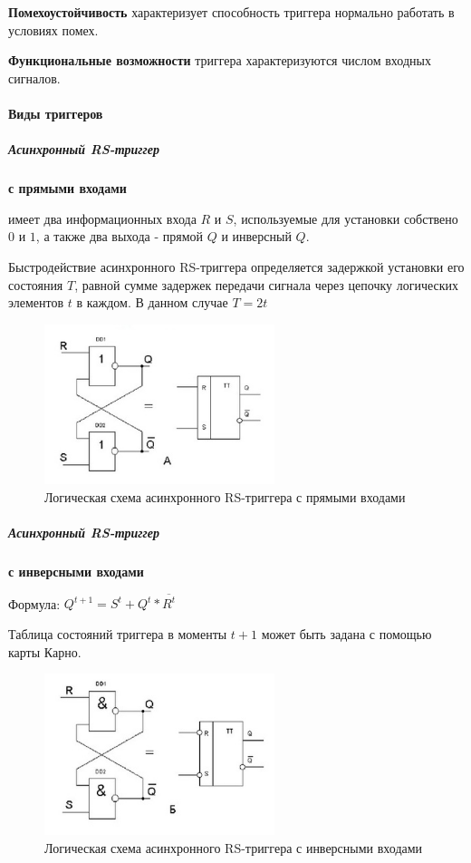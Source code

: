 \documentclass{article}
\begin{document}
\begin{flushleft}
\textbf{Помехоустойчивость} характеризует способность триггера нормально работать в условиях помех.

\textbf{Функциональные возможности} триггера характеризуются числом входных сигналов.

\paragraph{Виды триггеров}

\subparagraph{Асинхронный RS-триггер} \textbf{с прямыми входами}

имеет два информационных входа $R$ и $S$, используемые для установки собствено $0$ и $1$, а также два выхода - прямой $Q$ и инверсный $Q$.

Быстродействие асинхронного RS-триггера определяется задержкой установки его состояния $T$, равной сумме задержек передачи сигнала через цепочку логических элементов $t$ в каждом. В данном случае $T = 2t$

\begin{figure}
\caption{Логическая схема асинхронного RS-триггера с прямыми входами}
\includegraphics[width=0.6\textwidth]{assets/rs_direct.jpg}
\end{figure}

\pagebreak
\subparagraph{Асинхронный RS-триггер} \textbf{с инверсными входами}

Формула: $Q^{t + 1} = S^{t} + Q^{t} * \overline{R^{t}}$

Таблица состояний триггера в моменты $t + 1$ может быть задана с помощью карты Карно.

\begin{figure}
\caption{Логическая схема асинхронного RS-триггера с инверсными входами}
\includegraphics[width=0.6\textwidth]{assets/rs_invert.jpg}
\end{figure}


\end{flushleft}
\end{document}
